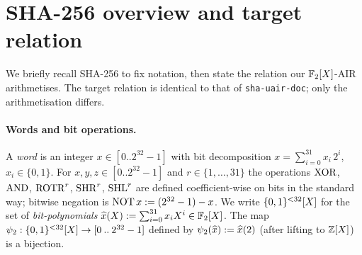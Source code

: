 \section{SHA-256 overview and target relation}\label{sec:overview}

We briefly recall SHA-256 to fix notation, then state the relation our
$\mathbb{F}_2[X]$-AIR arithmetises. The target relation is identical to that of
\texttt{sha-uair-doc}; only the arithmetisation differs.

\paragraph{Words and bit operations.}
A \emph{word} is an integer $x \in [0\mathbin{..}2^{32}-1]$ with bit
decomposition $x = \sum_{i=0}^{31} x_i\, 2^i$, $x_i \in \{0,1\}$.
For $x,y,z \in [0\mathbin{..}2^{32}-1]$ and $r \in \{1,\dots,31\}$ the
operations $\operatorname{XOR}$, $\operatorname{AND}$, $\operatorname{ROTR}^r$, $\operatorname{SHR}^r$, $\operatorname{SHL}^r$ are defined
coefficient-wise on bits in the standard way; bitwise negation is
$\operatorname{NOT} x := (2^{32}-1) - x$. We write $\{0,1\}^{<32}[X]$ for the set of
\emph{bit-polynomials}
$\widehat{x}(X) := \sum_{i=0}^{31} x_i X^i \in \mathbb{F}_2[X]$.
The map $\psi_{2}: \{0,1\}^{<32}[X] \to [0\mathbin{..}2^{32}-1]$ defined by
$\psi_{2}(\widehat{x}) := \widehat{x}(2)$ (after lifting to $\mathbb{Z}[X]$) is a
bijection.

